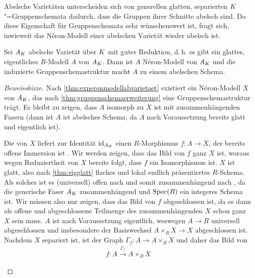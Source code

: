 Abelsche Varietäten unterscheiden sich von generellen glatten,
separierten $K$"=Gruppenschemata dadurch, dass die Gruppen ihrer
Schnitte abelsch sind. Da diese Eigenschaft für Gruppenschemata
sehr wünschenswert ist, fragt sich, inwieweit das Néron-Modell einer
abelschen Varietät wieder abelsch ist.
\begin{Satz}
  \label{thm:abelscheneronmodelle}
  Sei $A_{K}$ abelsche Varietät über $K$ mit guter Reduktion,
  d.\,h. es gibt ein glattes, eigentliches $R$-Modell $A$ von $A_{K}$.
  Dann ist $A$ Néron-Modell von $A_{K}$ und die induzierte
  Gruppenschemastruktur macht $A$ zu einem abelschen Schema.
  \begin{proof}[Beweisskizze]
    Nach \ref{thm:exneronmodellabvarietaet} existiert ein
    Néron-Modell $X$ von $A_{K}$, das nach
    \ref{thm:gruppenschemaerweiterung} eine Gruppenschemastruktur
    trägt.
    Es bleibt zu zeigen, dass $A$ isomorph zu $X$ ist
    mit zusammenhängenden Fasern (dann ist $A$ ist abelsches Schema,
    da $A$ nach Voraussetzung bereits glatt und eigentlich ist).
    \begin{description}[font=\normalfont\itshape]
    \item[$A$ isomorph zu $X$:]
      Die \NAbbEig von $X$ liefert zur Identität $\mathrm{id}_{A_{K}}$ einen
      $R$-Morphismus $f\colon A\to X$, der bereits offene Immersion ist
      \cite[s.][4.3/1~(ii) oder 4.4/1]{neron}.
      Wir werden zeigen, dass das Bild von $f$ ganz $X$ ist, woraus
      wegen Reduziertheit von $X$ bereits folgt, dass $f$ ein
      Isomorphismus ist.
      $X$ ist glatt, also nach
      \ref{thm:eigglatt} flaches und lokal endlich präsentiertes
      $R$-Schema.
      Als solches ist es (universell) offen nach
      \cite[Theorem 14.33]{wedhorn} und somit zusammenhängend nach
      \cite[Proposition 3.24]{wedhorn},
      da die generische Faser $A_{K}$ zusammenhängend und $\operatorname{Spec}(R)$
      ein integeres Schema ist.
      Wir müssen also nur zeigen, dass das Bild von $f$ abgeschlossen
      ist, da es dann als offene und abgeschlossene Teilmenge des
      zusammenhängenden $X$ schon ganz $X$ sein muss.
      $A$ ist nach Voraussetzung eigentlich, weswegen $A\to R$
      universell abgeschlossen und insbesondere der Basiswechsel
      $A\times_R X\to X$ abgeschlossen ist.
      Nachdem $X$ separiert ist, ist der Graph
      $\Gamma_f\colon A\to A\times_R X$ und daher das Bild von
      \begin{gather*}
        f\colon A\xrightarrow{\Gamma_f} A\times_R X

\end{gather*}
\end{description}
\end{proof}
\end{Satz}
